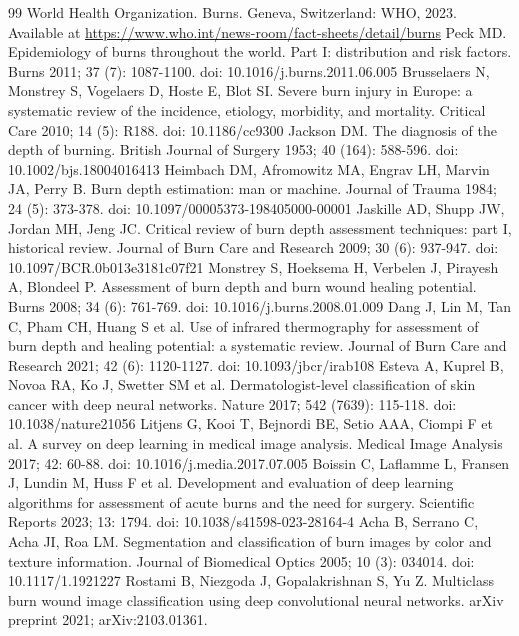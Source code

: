 \documentclass{elektr}
\begin{document}
\begin{thebibliography}{99}
 World Health Organization. Burns. Geneva, Switzerland: WHO, 2023. Available at \url{https://www.who.int/news-room/fact-sheets/detail/burns}
 Peck MD. Epidemiology of burns throughout the world. Part I: distribution and risk factors. Burns 2011; 37 (7): 1087-1100. doi: 10.1016/j.burns.2011.06.005
 Brusselaers N, Monstrey S, Vogelaers D, Hoste E, Blot SI. Severe burn injury in Europe: a systematic review of the incidence, etiology, morbidity, and mortality. Critical Care 2010; 14 (5): R188. doi: 10.1186/cc9300
 Jackson DM. The diagnosis of the depth of burning. British Journal of Surgery 1953; 40 (164): 588-596. doi: 10.1002/bjs.18004016413
 Heimbach DM, Afromowitz MA, Engrav LH, Marvin JA, Perry B. Burn depth estimation: man or machine. Journal of Trauma 1984; 24 (5): 373-378. doi: 10.1097/00005373-198405000-00001
 Jaskille AD, Shupp JW, Jordan MH, Jeng JC. Critical review of burn depth assessment techniques: part I, historical review. Journal of Burn Care and Research 2009; 30 (6): 937-947. doi: 10.1097/BCR.0b013e3181c07f21
 Monstrey S, Hoeksema H, Verbelen J, Pirayesh A, Blondeel P. Assessment of burn depth and burn wound healing potential. Burns 2008; 34 (6): 761-769. doi: 10.1016/j.burns.2008.01.009
 Dang J, Lin M, Tan C, Pham CH, Huang S et al. Use of infrared thermography for assessment of burn depth and healing potential: a systematic review. Journal of Burn Care and Research 2021; 42 (6): 1120-1127. doi: 10.1093/jbcr/irab108
 Esteva A, Kuprel B, Novoa RA, Ko J, Swetter SM et al. Dermatologist-level classification of skin cancer with deep neural networks. Nature 2017; 542 (7639): 115-118. doi: 10.1038/nature21056
 Litjens G, Kooi T, Bejnordi BE, Setio AAA, Ciompi F et al. A survey on deep learning in medical image analysis. Medical Image Analysis 2017; 42: 60-88. doi: 10.1016/j.media.2017.07.005
 Boissin C, Laflamme L, Fransen J, Lundin M, Huss F et al. Development and evaluation of deep learning algorithms for assessment of acute burns and the need for surgery. Scientific Reports 2023; 13: 1794. doi: 10.1038/s41598-023-28164-4
 Acha B, Serrano C, Acha JI, Roa LM. Segmentation and classification of burn images by color and texture information. Journal of Biomedical Optics 2005; 10 (3): 034014. doi: 10.1117/1.1921227
 Rostami B, Niezgoda J, Gopalakrishnan S, Yu Z. Multiclass burn wound image classification using deep convolutional neural networks. arXiv preprint 2021; arXiv:2103.01361.

\end{thebibliography}
\end{document}
